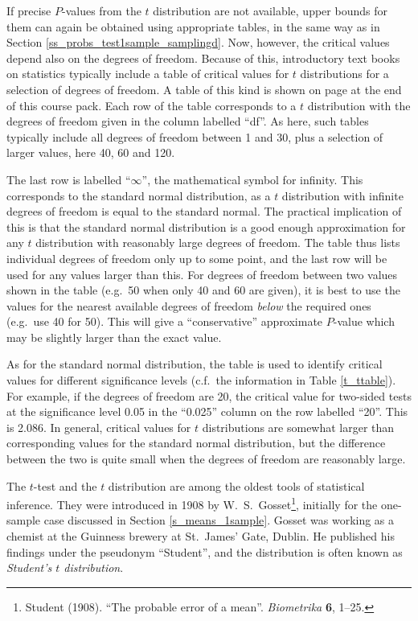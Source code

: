 If precise $P$-values from the $t$ distribution are not available,
upper bounds for them can again be obtained using appropriate tables, in
the same way as in Section
\ref{ss_probs_test1sample_samplingd}. Now, however,
the critical values depend also on the degrees of freedom. Because of
this, introductory text books on statistics typically include a
table of critical values for $t$ distributions for a selection of
degrees of freedom. A table of this kind is shown on page
\pageref{s_disttables_t} at the end of this course pack. Each row of the
table corresponds to a $t$ distribution with the degrees of freedom
given in the column labelled ``df''. As here, such tables
typically include all degrees of freedom between 1 and 30, plus
a selection of larger values, here 40, 60 and 120.

The last row is labelled ``$\infty$'', the mathematical symbol for
infinity. This corresponds to the standard normal distribution, as a $t$
distribution with infinite degrees of freedom is equal to the standard normal. The practical implication of this is that
the standard normal distribution is a good enough approximation for any
$t$ distribution with reasonably large degrees of freedom. The table
thus lists individual degrees of freedom only up to some point, and the
last row will be used for any values larger than this. For
degrees of freedom between two values shown in the table (e.g.\ 50 when
only 40 and 60 are given), it is best to use the values for the nearest
available degrees of freedom \emph{below} the required ones (e.g.\ use
40 for 50). This will give a ``conservative'' approximate
$P$-value which may be slightly larger than the exact value.

As for the standard normal distribution, the table is used to identify
critical values for different significance levels (c.f.\ the information
in Table \ref{t_ttable}). For example, if the degrees of freedom are 20,
the critical value for two-sided tests at the significance level 0.05 in
the ``0.025'' column on the row labelled ``20''. This is 2.086. In
general, critical values for $t$ distributions are somewhat larger than
corresponding values for the standard normal distribution, but the
difference between the two is quite small when the degrees of freedom
are reasonably large.


The $t$-test and the $t$ distribution are among the oldest tools of
statistical inference. They were introduced in 1908 by W.\ S.\
Gosset\footnote{Student (1908). ``The probable error of a mean''.
\emph{Biometrika} \textbf{6}, 1--25.}, initially for the one-sample case
discussed in Section \ref{s_means_1sample}. Gosset was working as a
chemist at the Guinness brewery at St.\ James' Gate, Dublin. He
published his findings under the pseudonym ``Student'', and the
distribution is often known as \emph{Student's $t$ distribution}.

